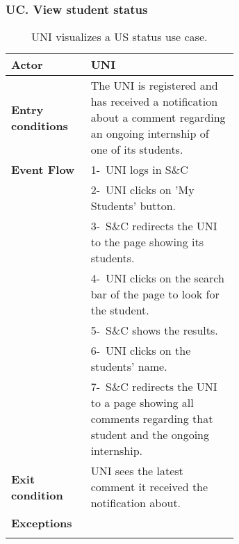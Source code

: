 \subsubsection*{UC\cuc. View student status}
\begin{center}
    \begin{longtable}{|l|p{0.65\linewidth}|}
        \hline
        \textbf{Actor}            & UNI \\
        \hline
        \textbf{Entry conditions} & The UNI is registered and has received a notification about a comment regarding an ongoing internship of one of its students.\\
        \hline
        \textbf{Event Flow}       & 1-\ UNI logs in S\&C \\
        & 2-\ UNI clicks on 'My Students' button. \\
        & 3-\ S\&C redirects the UNI to the page showing its students. \\
        & 4-\ UNI clicks on the search bar of the page to look for the student. \\
        & 5-\ S\&C shows the results.\\
        & 6-\ UNI clicks on the students' name.\\
        & 7-\ S\&C redirects the UNI to a page showing all comments regarding that student and the ongoing internship.\\
        \hline
        \textbf{Exit condition}   &  UNI sees the latest comment it received the notification about. \\
        \hline
        \textbf{Exceptions}       &  \\
        \hline
        \caption{UNI visualizes a US status use case.}
        \label{tab: cp_use_case}
    \end{longtable}
\end{center}

